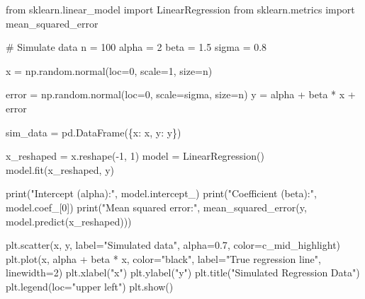 \documentclass[
  letterpaper,
  DIV=11,
  numbers=noendperiod]{scrartcl}
\newenvironment{Shaded}{\begin{snugshade}}{\end{snugshade}}
\newcommand{\BuiltInTok}[1]{\textcolor[rgb]{0.00,0.23,0.31}{#1}}
\newcommand{\CommentTok}[1]{\textcolor[rgb]{0.37,0.37,0.37}{#1}}
\newcommand{\DecValTok}[1]{\textcolor[rgb]{0.68,0.00,0.00}{#1}}
\newcommand{\FloatTok}[1]{\textcolor[rgb]{0.68,0.00,0.00}{#1}}
\newcommand{\ImportTok}[1]{\textcolor[rgb]{0.00,0.46,0.62}{#1}}
\newcommand{\NormalTok}[1]{\textcolor[rgb]{0.00,0.23,0.31}{#1}}
\newcommand{\OperatorTok}[1]{\textcolor[rgb]{0.37,0.37,0.37}{#1}}
\newcommand{\StringTok}[1]{\textcolor[rgb]{0.13,0.47,0.30}{#1}}
\begin{document}
\begin{Shaded}
\begin{Highlighting}[]
\ImportTok{from}\NormalTok{ sklearn.linear\_model }\ImportTok{import}\NormalTok{ LinearRegression}
\ImportTok{from}\NormalTok{ sklearn.metrics }\ImportTok{import}\NormalTok{ mean\_squared\_error}

\CommentTok{\# Simulate data}
\NormalTok{n }\OperatorTok{=} \DecValTok{100}      
\NormalTok{alpha }\OperatorTok{=} \DecValTok{2}        
\NormalTok{beta }\OperatorTok{=} \FloatTok{1.5}       
\NormalTok{sigma }\OperatorTok{=} \FloatTok{0.8}      

\NormalTok{x }\OperatorTok{=}\NormalTok{ np.random.normal(loc}\OperatorTok{=}\DecValTok{0}\NormalTok{, scale}\OperatorTok{=}\DecValTok{1}\NormalTok{, size}\OperatorTok{=}\NormalTok{n)}

\NormalTok{error }\OperatorTok{=}\NormalTok{ np.random.normal(loc}\OperatorTok{=}\DecValTok{0}\NormalTok{, scale}\OperatorTok{=}\NormalTok{sigma, size}\OperatorTok{=}\NormalTok{n)}
\NormalTok{y }\OperatorTok{=}\NormalTok{ alpha }\OperatorTok{+}\NormalTok{ beta }\OperatorTok{*}\NormalTok{ x }\OperatorTok{+}\NormalTok{ error}

\NormalTok{sim\_data }\OperatorTok{=}\NormalTok{ pd.DataFrame(\{}\StringTok{\textquotesingle{}x\textquotesingle{}}\NormalTok{: x, }\StringTok{\textquotesingle{}y\textquotesingle{}}\NormalTok{: y\})}

\NormalTok{x\_reshaped }\OperatorTok{=}\NormalTok{ x.reshape(}\OperatorTok{{-}}\DecValTok{1}\NormalTok{, }\DecValTok{1}\NormalTok{)  }
\NormalTok{model }\OperatorTok{=}\NormalTok{ LinearRegression()}
\NormalTok{model.fit(x\_reshaped, y)}

\BuiltInTok{print}\NormalTok{(}\StringTok{"Intercept (alpha):"}\NormalTok{, model.intercept\_)}
\BuiltInTok{print}\NormalTok{(}\StringTok{"Coefficient (beta):"}\NormalTok{, model.coef\_[}\DecValTok{0}\NormalTok{])}
\BuiltInTok{print}\NormalTok{(}\StringTok{"Mean squared error:"}\NormalTok{, mean\_squared\_error(y, model.predict(x\_reshaped)))}

\NormalTok{plt.scatter(x, y, label}\OperatorTok{=}\StringTok{"Simulated data"}\NormalTok{, alpha}\OperatorTok{=}\FloatTok{0.7}\NormalTok{, color}\OperatorTok{=}\NormalTok{c\_mid\_highlight)}
\NormalTok{plt.plot(x, alpha }\OperatorTok{+}\NormalTok{ beta }\OperatorTok{*}\NormalTok{ x, color}\OperatorTok{=}\StringTok{"black"}\NormalTok{, label}\OperatorTok{=}\StringTok{"True regression line"}\NormalTok{, linewidth}\OperatorTok{=}\DecValTok{2}\NormalTok{)}
\NormalTok{plt.xlabel(}\StringTok{"x"}\NormalTok{)}
\NormalTok{plt.ylabel(}\StringTok{"y"}\NormalTok{)}
\NormalTok{plt.title(}\StringTok{"Simulated Regression Data"}\NormalTok{)}
\NormalTok{plt.legend(loc}\OperatorTok{=}\StringTok{"upper left"}\NormalTok{)}
\NormalTok{plt.show()}
\end{Highlighting}
\end{Shaded}
\end{document}
